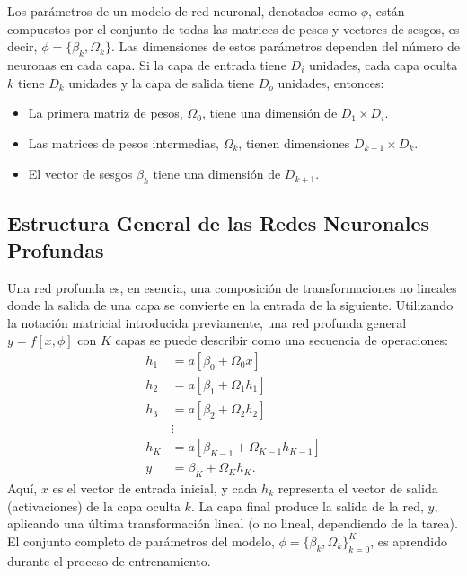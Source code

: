 Los parámetros de un modelo de red neuronal, denotados como $\phi$, están compuestos por el conjunto de todas las matrices de pesos y vectores de sesgos, es decir, $\phi = \{\beta_k, \Omega_k\}$. Las dimensiones de estos parámetros dependen del número de neuronas en cada capa. Si la capa de entrada tiene $D_i$ unidades, cada capa oculta $k$ tiene $D_k$ unidades y la capa de salida tiene $D_o$ unidades, entonces:
\begin{itemize}
    \item La primera matriz de pesos, $\Omega_0$, tiene una dimensión de $D_1 \times D_i$.
    \item Las matrices de pesos intermedias, $\Omega_k$, tienen dimensiones $D_{k+1} \times D_k$.
    \item El vector de sesgos $\beta_k$ tiene una dimensión de $D_{k+1}$.
\end{itemize}

\subsection{Estructura General de las Redes Neuronales Profundas}

Una red profunda es, en esencia, una composición de transformaciones no lineales donde la salida de una capa se convierte en la entrada de la siguiente. Utilizando la notación matricial introducida previamente, una red profunda general $y = f[x, \phi]$ con $K$ capas se puede describir como una secuencia de operaciones:
\begin{align}
    h_1 &= a[\beta_0 + \Omega_0x] \\
    h_2 &= a[\beta_1 + \Omega_1h_1] \\
    h_3 &= a[\beta_2 + \Omega_2h_2] \\
    &\vdots \\
    h_K &= a[\beta_{K-1} + \Omega_{K-1}h_{K-1}] \\
    y &= \beta_K + \Omega_K h_K.
    \label{eq:general_deep_nn}
\end{align}
Aquí, $x$ es el vector de entrada inicial, y cada $h_k$ representa el vector de salida (activaciones) de la capa oculta $k$. La capa final produce la salida de la red, $y$, aplicando una última transformación lineal (o no lineal, dependiendo de la tarea). El conjunto completo de parámetros del modelo, $\phi = \{\beta_k, \Omega_k\}_{k=0}^K$, es aprendido durante el proceso de entrenamiento.


